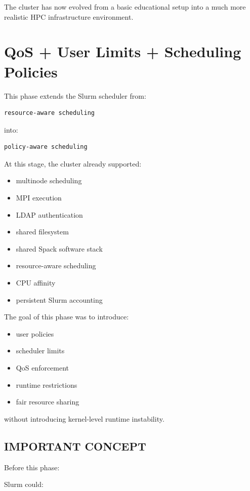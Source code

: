 \documentclass[11pt]{article}
\begin{document}
The cluster has now evolved from a basic educational setup into a much
more realistic HPC infrastructure environment.
\section{QoS + User Limits + Scheduling Policies}
\label{sec:orgeabf07d}

This phase extends the Slurm scheduler from:

\begin{verbatim}
resource-aware scheduling
\end{verbatim}

into:

\begin{verbatim}
policy-aware scheduling
\end{verbatim}

At this stage, the cluster already supported:

\begin{itemize}
\item multinode scheduling
\item MPI execution
\item LDAP authentication
\item shared filesystem
\item shared Spack software stack
\item resource-aware scheduling
\item CPU affinity
\item persistent Slurm accounting
\end{itemize}

The goal of this phase was to introduce:

\begin{itemize}
\item user policies
\item scheduler limits
\item QoS enforcement
\item runtime restrictions
\item fair resource sharing
\end{itemize}

without introducing kernel-level runtime instability.
\subsection{IMPORTANT CONCEPT}
\label{sec:org10e1299}

Before this phase:

Slurm could:
\end{document}
